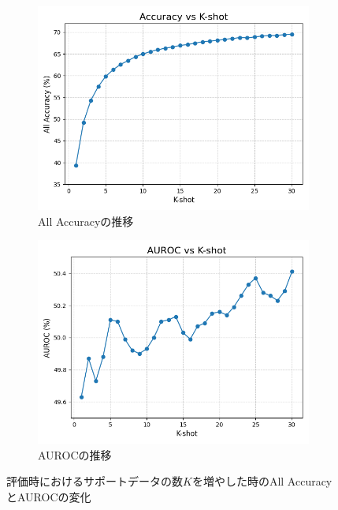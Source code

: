 \documentclass[a4paper,11pt,nomag]{jsreport}
\begin{document}
\begin{figure}[tbp]
  \centering
  \begin{subfigure}[b]{0.45\linewidth}
    \centering
    \includegraphics[height=0.9\linewidth, keepaspectratio]{image/sec2k-shotVSaccuracy.png}
    \caption{All Accuracyの推移}
    \label{fig:sec2Accuracy}
  \end{subfigure}
  \hfill
  \begin{subfigure}[b]{0.45\linewidth}
    \centering
    \includegraphics[height=0.9\linewidth, keepaspectratio]{image/sec2k-shotVSAUROC.png}
    \caption{AUROCの推移}
    \label{fig:sec2AUROC}
  \end{subfigure}
  \caption{評価時におけるサポートデータの数$K$を増やした時のAll AccuracyとAUROCの変化}
  \label{fig:k-shot}
\end{figure}
\end{document}
